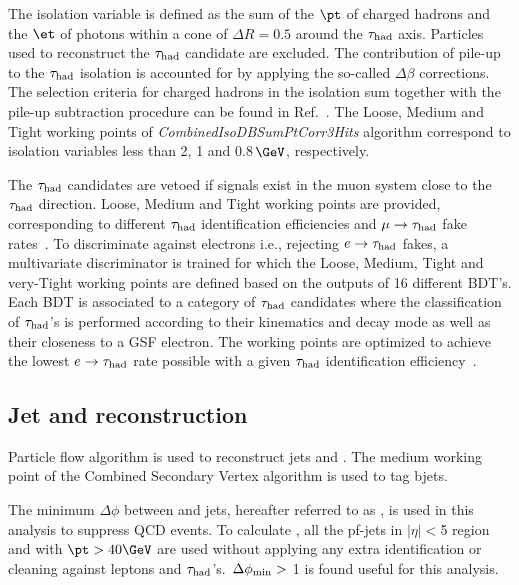 The isolation variable is defined as the sum of the $\pt$ of charged hadrons and the $\et$ of photons within a cone of $\Delta R = 0.5$ around the $\tau_{\rm had}$ axis. Particles used to reconstruct the $\tau_{\rm had}$ candidate are excluded. The contribution of pile-up to the $\tau_{\rm had}$ isolation is accounted for by applying the so-called $\Delta\beta$ corrections. The selection criteria for charged hadrons in the isolation sum together with the pile-up subtraction procedure can be found in Ref.~\cite{CMS_AN_2013-171}. The Loose, Medium and Tight working points of {\it CombinedIsoDBSumPtCorr3Hits} algorithm correspond to isolation variables less than 2, 1 and 0.8\,$\GeV$, respectively.

The $\tau_{\rm had}$ candidates are vetoed if signals exist in the muon system close to the $\tau_{\rm had}$ direction. Loose, Medium and Tight working points are provided, corresponding to different $\tau_{\rm had}$ identification efficiencies and $\mu\to\tau_{\rm had}$ fake rates~\cite{CMS_AN_2013-171}. To discriminate against electrons i.e., rejecting $e\to\tau_{\rm had}$ fakes, a multivariate discriminator is trained for which the Loose, Medium, Tight and very-Tight working points are defined based on the outputs of 16 different BDT's. Each BDT is associated to a category of $\tau_{\rm had}$ candidates where the classification of $\tau_{\rm had}$'s is performed according to their kinematics and decay mode as well as their closeness to a GSF electron. The working points are optimized to achieve the lowest $e\to\tau_{\rm had}$ rate possible with a given $\tau_{\rm had}$ identification efficiency~\cite{CMS_AN_2012-417}.

\subsection{\texorpdfstring{Jet and \MPT reconstruction}{Jet and MET reconstruction}}
\label{sec:jetmet}
Particle flow algorithm is used to reconstruct jets and \MPT. The medium working point of the Combined Secondary Vertex algorithm is used to tag bjets.

The minimum $\Delta\phi$ between \ETmiss and jets, hereafter referred to as \mindphifour, is used in this analysis to suppress QCD events. To calculate \mindphifour, all the pf-jets in $|\eta|<$5 region and with $\pt>40\GeV$ are used without applying any extra identification or cleaning against leptons and $\tau_{\rm had}$'s. $\,{\Delta\phi_{\rm min}} >$ 1 is found useful for this analysis. 

